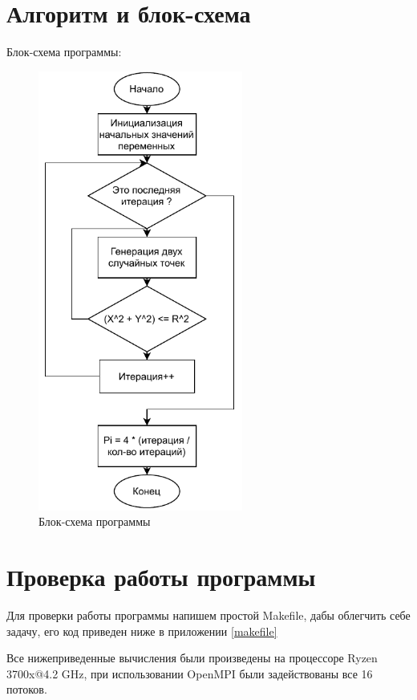 \documentclass[a4paper,14pt]{extarticle}
\begin{document}
\section{Алгоритм и блок-схема}			
Блок-схема программы:	
\begin{figure}[H]
	\centering
	\includegraphics[page=1, width=0.6\textwidth]{include/block_scheme.pdf}
	\caption{Блок-схема программы}
\end{figure}

\newpage

\section{Проверка работы программы}
Для проверки работы программы напишем простой Makefile, дабы облегчить себе задачу, его код приведен ниже в приложении \ref{makefile}

Все нижеприведенные вычисления были произведены на процессоре Ryzen 3700x@4.2 GHz, при использовании OpenMPI были задействованы все 16 потоков.
\end{document}
